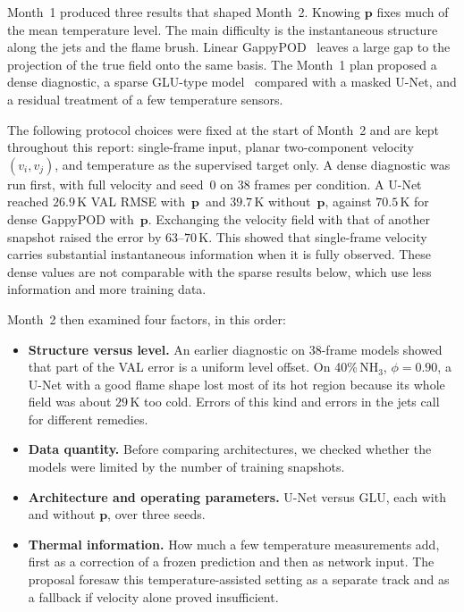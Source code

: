 \documentclass[11pt,letterpaper]{article}
\newcommand{\K}{\,\mathrm{K}}
\newcommand{\pon}{with~$\mathbf{p}$}
\newcommand{\poff}{without~$\mathbf{p}$}
\newcommand{\NH}{\text{NH}_3}
\newcommand{\cond}[2]{#1\%\,$\NH$, $\phi{=}#2$}
\begin{document}
Month~1 produced three results that shaped Month~2. Knowing $\mathbf{p}$ fixes much of the mean temperature level. The main difficulty is the instantaneous structure along the jets and the flame brush. Linear GappyPOD~\cite{everson1995gappy} leaves a large gap to the projection of the true field onto the same basis. The Month~1 plan proposed a dense diagnostic, a sparse GLU-type model~\cite{wang2026glu} compared with a masked U-Net, and a residual treatment of a few temperature sensors.

The following protocol choices were fixed at the start of Month~2 and are kept throughout this report: single-frame input, planar two-component velocity $(v_i,v_j)$, and temperature as the supervised target only. A dense diagnostic was run first, with full velocity and seed~0 on 38 frames per condition. A U-Net reached $26.9\K$ VAL RMSE \pon\ and $39.7\K$ \poff, against $70.5\K$ for dense GappyPOD \pon. Exchanging the velocity field with that of another snapshot raised the error by $63$--$70\K$. This showed that single-frame velocity carries substantial instantaneous information when it is fully observed. These dense values are not comparable with the sparse results below, which use less information and more training data.

Month~2 then examined four factors, in this order:
\begin{itemize}
  \item \textbf{Structure versus level.} An earlier diagnostic on 38-frame models showed that part of the VAL error is a uniform level offset. On \cond{40}{0.90}, a U-Net with a good flame shape lost most of its hot region because its whole field was about $29\K$ too cold. Errors of this kind and errors in the jets call for different remedies.
  \item \textbf{Data quantity.} Before comparing architectures, we checked whether the models were limited by the number of training snapshots.
  \item \textbf{Architecture and operating parameters.} U-Net versus GLU, each with and without $\mathbf{p}$, over three seeds.
  \item \textbf{Thermal information.} How much a few temperature measurements add, first as a correction of a frozen prediction and then as network input. The proposal foresaw this temperature-assisted setting as a separate track and as a fallback if velocity alone proved insufficient.
\end{itemize}

\end{document}
